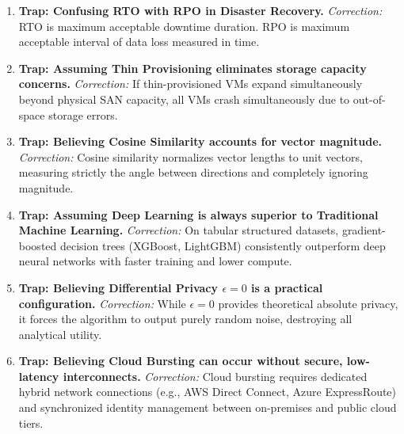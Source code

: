 \begin{enumerate}[label=\arabic*.,leftmargin=2em]
    \item \textbf{Trap: Confusing RTO with RPO in Disaster Recovery.}
    \textit{Correction:} RTO is maximum acceptable downtime duration. RPO is maximum acceptable interval of data loss measured in time.

    \item \textbf{Trap: Assuming Thin Provisioning eliminates storage capacity concerns.}
    \textit{Correction:} If thin-provisioned VMs expand simultaneously beyond physical SAN capacity, all VMs crash simultaneously due to out-of-space storage errors.

    \item \textbf{Trap: Believing Cosine Similarity accounts for vector magnitude.}
    \textit{Correction:} Cosine similarity normalizes vector lengths to unit vectors, measuring strictly the angle between directions and completely ignoring magnitude.

    \item \textbf{Trap: Assuming Deep Learning is always superior to Traditional Machine Learning.}
    \textit{Correction:} On tabular structured datasets, gradient-boosted decision trees (XGBoost, LightGBM) consistently outperform deep neural networks with faster training and lower compute.

    \item \textbf{Trap: Believing Differential Privacy $\epsilon = 0$ is a practical configuration.}
    \textit{Correction:} While $\epsilon = 0$ provides theoretical absolute privacy, it forces the algorithm to output purely random noise, destroying all analytical utility.

    \item \textbf{Trap: Believing Cloud Bursting can occur without secure, low-latency interconnects.}
    \textit{Correction:} Cloud bursting requires dedicated hybrid network connections (e.g., AWS Direct Connect, Azure ExpressRoute) and synchronized identity management between on-premises and public cloud tiers.
\end{enumerate}
